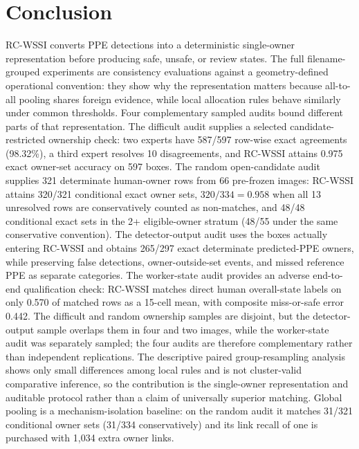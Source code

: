 \documentclass[iicol,pdflatex,sn-mathphys-num]{sn-jnl}
\begin{document}
\section{Conclusion}\label{sec:conclusion}

RC-WSSI converts PPE detections into a deterministic single-owner representation before producing safe, unsafe, or review states. The full filename-grouped experiments are consistency evaluations against a geometry-defined operational convention: they show why the representation matters because all-to-all pooling shares foreign evidence, while local allocation rules behave similarly under common thresholds. Four complementary sampled audits bound different parts of that representation. The difficult audit supplies a selected candidate-restricted ownership check: two experts have 587/597 row-wise exact agreements (98.32\%), a third expert resolves 10 disagreements, and RC-WSSI attains 0.975 exact owner-set accuracy on 597 boxes. The random open-candidate audit supplies 321 determinate human-owner rows from 66 pre-frozen images: RC-WSSI attains 320/321 conditional exact owner sets, $320/334=0.958$ when all 13 unresolved rows are conservatively counted as non-matches, and 48/48 conditional exact sets in the 2+ eligible-owner stratum (48/55 under the same conservative convention). The detector-output audit uses the boxes actually entering RC-WSSI and obtains 265/297 exact determinate predicted-PPE owners, while preserving false detections, owner-outside-set events, and missed reference PPE as separate categories. The worker-state audit provides an adverse end-to-end qualification check: RC-WSSI matches direct human overall-state labels on only 0.570 of matched rows as a 15-cell mean, with composite miss-or-safe error 0.442. The difficult and random ownership samples are disjoint, but the detector-output sample overlaps them in four and two images, while the worker-state audit was separately sampled; the four audits are therefore complementary rather than independent replications. The descriptive paired group-resampling analysis shows only small differences among local rules and is not cluster-valid comparative inference, so the contribution is the single-owner representation and auditable protocol rather than a claim of universally superior matching. Global pooling is a mechanism-isolation baseline: on the random audit it matches 31/321 conditional owner sets (31/334 conservatively) and its link recall of one is purchased with 1,034 extra owner links.
\end{document}
